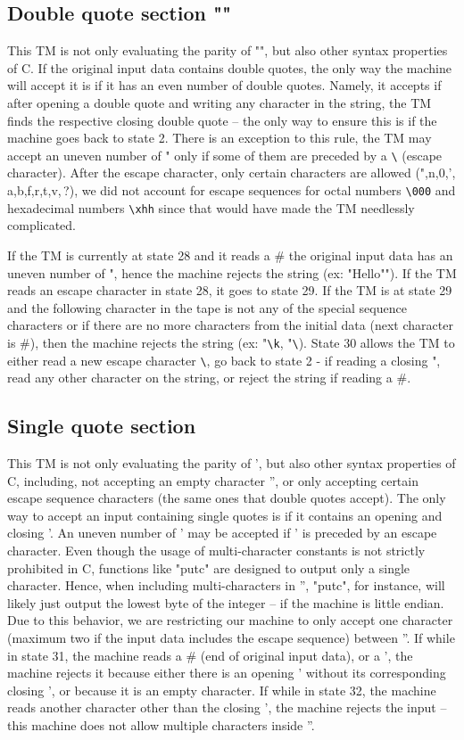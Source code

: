 \documentclass{article}
\begin{document}
\subsection{Double quote section ""}
This TM is not only evaluating the parity of "", but also other syntax properties of C. If the original input data contains double quotes, 
the only way the machine will accept it is if it has an even number of double quotes. Namely, it accepts if after opening a double quote and writing 
any character in the string, the TM finds the respective closing double quote – the only way to ensure this is if the machine goes back to state 2. 
There is an exception to this rule, the TM may accept an uneven number of " only if some of them are preceded by a \verb|\| (escape character). 
After the escape character, only certain characters are allowed (",n,0,', a,b,f,r,t,v,\,?), we did not account for escape sequences for octal 
numbers \verb|\000| and hexadecimal numbers \verb|\xhh| since that would have made the TM needlessly complicated.

If the TM is currently at state 28 and it reads a $\#$ the original input data has an uneven number of ", hence the machine rejects the string (ex: "Hello""). 
If the TM reads an escape character in state 28, it goes to state 29. If the TM is at state 29 and the following character in the tape is not any of 
the special sequence characters or if there are no more characters from the initial data (next character is $\#$), then the machine rejects the string 
(ex: "\verb|\k|, "\verb|\|). State 30 allows the TM to either read a new escape character \verb|\|, go back to state 2 - if reading a closing ", read any other character
on the string, or reject the string if reading a $\#$. 

\subsection{Single quote section}

This TM is not only evaluating the parity of ', but also other syntax properties of C, including, not accepting an empty character '', or only accepting certain escape 
sequence characters (the same ones that double quotes accept). The only way to accept an input containing single quotes is if it contains an opening and closing '. 
An uneven number of ' may be accepted if ' is preceded by an escape character. Even though the usage of multi-character constants is not strictly prohibited in C,
functions like "putc" are designed to output only a single character. Hence, when including multi-characters in '', "putc", for instance, will likely just output the 
lowest byte of the integer – if the machine is little endian. Due to this behavior, we are restricting our machine to only accept one character (maximum two if the 
input data includes the escape sequence) between ''. If while in state 31, the machine reads a $\#$ (end of original input data), or a ', the machine rejects it because 
either there is an opening ' without its corresponding closing ', or because it is an empty character. If while in state 32, the machine reads another character 
other than the closing ', the machine rejects the input – this machine does not allow multiple characters inside ''. 
\end{document}
